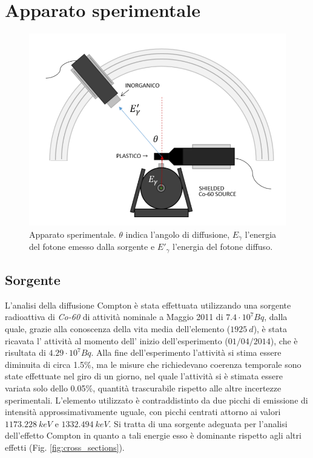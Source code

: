 \documentclass[5pt]{article}
\begin{document}
\section{Apparato sperimentale} \label{sec:apparato}
\begin{figure}
\begin{center}
\includegraphics[scale=0.5]{Apparato2}
\caption{Apparato sperimentale. $\theta$ indica l'angolo di diffusione, $E_\gamma$ l'energia del fotone emesso dalla sorgente e $E'_\gamma$ l'energia del fotone diffuso.}
\label{fig:apparato}
\end{center}
\end{figure}



\subsection{Sorgente}
L'analisi della diffusione Compton è stata effettuata utilizzando una sorgente radioattiva di \textit{Co-60} di attività nominale a Maggio 2011 di $7.4 \cdot 10^7 Bq$, dalla quale, grazie alla conoscenza della vita media dell'elemento ($1925 \ d$), è stata ricavata l' attività al momento dell' inizio dell'esperimento ($01/04/2014$), che è risultata di $4.29 \cdot 10^7 Bq$. Alla fine dell'esperimento l'attività si stima essere diminuita di circa 1.5\%, ma le misure che richiedevano coerenza temporale sono state effettuate nel giro di un giorno, nel quale l'attività si è stimata essere variata solo dello 0.05\%, quantità trascurabile rispetto alle altre incertezze sperimentali.
L'elemento utilizzato è contraddistinto da due picchi di emissione di intensità approssimativamente uguale, con picchi centrati attorno ai valori $1173.228 \ keV$ e $1332.494 \ keV$. 
Si tratta di una sorgente adeguata per l'analisi dell'effetto Compton in quanto a tali energie esso è dominante rispetto agli altri effetti (Fig. \ref{fig:cross_sections}).
\end{document}
